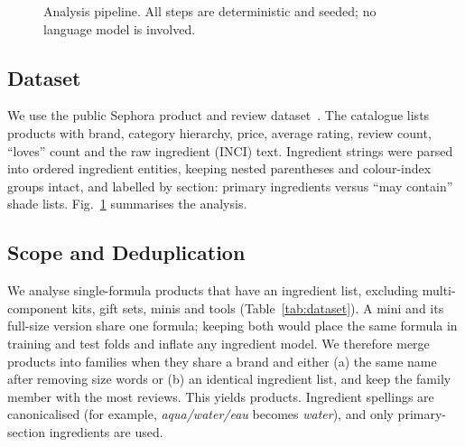 \documentclass[11pt,a4paper]{article}
\begin{document}
\begin{figure}[htbp]
\centering
{}
\caption{Analysis pipeline. All steps are deterministic and seeded; no language model is involved.}
\label{fig:pipeline}
\end{figure}

\subsection{Dataset}
We use the public Sephora product and review dataset~\cite{sephoradata}. The catalogue lists \NCatalogue{} products with brand, category hierarchy, price, average rating, review count, ``loves'' count and the raw ingredient (INCI) text. Ingredient strings were parsed into ordered ingredient entities, keeping nested parentheses and colour-index groups intact, and labelled by section: primary ingredients versus ``may contain'' shade lists. Fig.~\ref{fig:pipeline} summarises the analysis.

\subsection{Scope and Deduplication}
We analyse single-formula products that have an ingredient list, excluding multi-component kits, gift sets, minis and tools (Table~\ref{tab:dataset}). A mini and its full-size version share one formula; keeping both would place the same formula in training and test folds and inflate any ingredient model. We therefore merge products into families when they share a brand and either (a) the same name after removing size words or (b) an identical ingredient list, and keep the family member with the most reviews. This yields \NAnalysed{} products. Ingredient spellings are canonicalised (for example, \emph{aqua/water/eau} becomes \emph{water}), and only primary-section ingredients are used.
\end{document}
